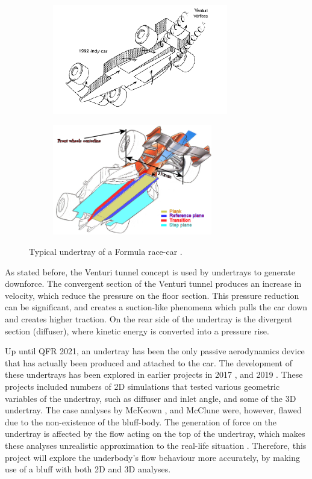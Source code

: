 \begin{figure}[!ht]
\begin{center}
%    
  \begin{subfigure}[b]{0.4\textwidth}
    \includegraphics[height=4.8cm]{Figures/underbody.PNG}
  \end{subfigure}
  \begin{subfigure}[b]{0.4\textwidth}
    \includegraphics[height=4.8cm]{Figures/undertray_f1.png}
  \end{subfigure}
%  
  \caption{Typical undertray of a Formula race-car \cite{Katz1995RaceSpeed}\cite{AnonymousUndertrayUnderbody}.}
    \label{fig:underbody}
\end{center}
\end{figure}

\noindent As stated before, the Venturi tunnel concept is used by undertrays to generate downforce. The convergent section of the Venturi tunnel produces an increase in velocity, which reduce the pressure on the floor section. This pressure reduction can be significant, and creates a suction-like phenomena which pulls the car down and creates higher traction. On the rear side of the undertray is the divergent section (diffuser), where kinetic energy is converted into a pressure rise. 

\noindent Up until QFR 2021, an undertray has been the only passive aerodynamics device that has actually been produced and attached to the car. The development of these undertrays has been explored in earlier projects in 2017 \cite{McKeown2018DesignCar}, and 2019 \cite{McClune2018DesignCar}. These projects included numbers of 2D simulations that tested various geometric variables of the undertray, such as diffuser and inlet angle, and some of the 3D undertray. The case analyses by McKeown \cite{McKeown2018DesignCar}, and McClune \cite{McClune2018DesignCar} were, however, flawed due to the non-existence of the bluff-body. The generation of force on the undertray is affected by the flow acting on the top of the undertray, which makes these analyses unrealistic approximation to the real-life situation \cite{Corr2017MechanicalAuthor}. Therefore, this project will explore the underbody's flow behaviour more accurately, by making use of a bluff with both 2D and 3D analyses. 

